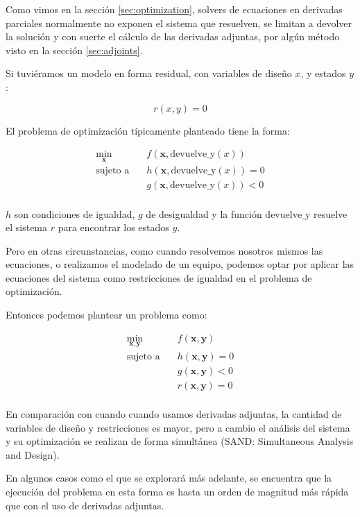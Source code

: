 Como vimos en la sección \ref{sec:optimization}, solvers de ecuaciones en
derivadas parciales normalmente no exponen el sistema que resuelven, se limitan
a devolver la solución y con suerte el cálculo de las derivadas adjuntas, por
algún método visto en la sección \ref{sec:adjoints}.

Si tuviéramos un modelo en forma residual, con variables de diseño $x$, y
estados $y$:

\begin{equation}
	r(x, y) = 0
\end{equation}

El problema de optimización típicamente planteado tiene la forma:

\begin{align}
	\min_{\mathbf{x}} \quad & f(\mathbf{x}, \text{devuelve\_y}(x)) \nonumber     \\
	\text{sujeto a} \quad   & h(\mathbf{x}, \text{devuelve\_y}(x)) = 0 \nonumber \\
	                        & g(\mathbf{x}, \text{devuelve\_y}(x)) < 0 \nonumber \\
\end{align}

$h$ son condiciones de igualdad, $g$ de desigualdad y la función
$\text{devuelve\_y}$ resuelve el sistema $r$ para encontrar los estados $y$.

Pero en otras circunstancias, como cuando resolvemos nosotros mismos las
ecuaciones, o realizamos el modelado de un equipo, podemos optar por aplicar
las ecuaciones del sistema como restricciones de igualdad en el problema de
optimización.

Entonces podemos plantear un problema como:

\begin{align}
	\min_{\mathbf{x}, \mathbf{y}} \quad & f(\mathbf{x}, \mathbf{y}) \nonumber     \\
	\text{sujeto a} \quad               & h(\mathbf{x}, \mathbf{y}) = 0 \nonumber \\
	                                    & g(\mathbf{x}, \mathbf{y}) < 0 \nonumber \\
	                                    & r(\mathbf{x}, \mathbf{y}) = 0 \nonumber \\
\end{align}

En comparación con cuando cuando usamos derivadas adjuntas, la cantidad de
variables de diseño y restricciones es mayor, pero a cambio el análisis del
sistema y su optimización se realizan de forma simultánea (SAND: Simultaneous
Analysis and Design).

En algunos casos como el que se explorará más adelante, se encuentra que la
ejecución del problema en esta forma es hasta un orden de magnitud más rápida
que con el uso de derivadas adjuntas.

